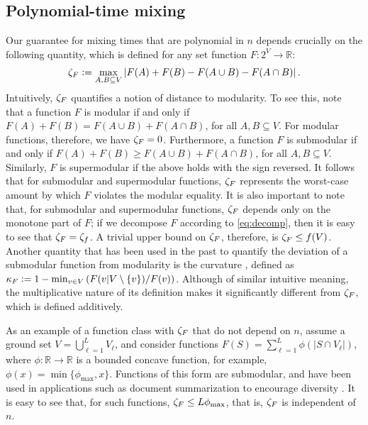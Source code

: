 \subsection{Polynomial-time mixing} \label{sect:poly}
Our guarantee for mixing times that are polynomial in $n$ depends crucially on the following quantity, which is defined for any set function $F : 2^V \to \mathbb{R}$:
\begin{align*}
  \zeta_F \vcentcolon= \max_{A, B \subseteq V} \left|F(A) + F(B) - F(A \cup B) - F(A \cap B) \right|.
\end{align*}
Intuitively, $\zeta_F$ quantifies a notion of distance to modularity.
To see this, note that a function $F$ is modular if and only if $F(A) + F(B) = F(A \cup B) + F(A \cap B)$, for all $A, B \subseteq V$.
For modular functions, therefore, we have $\zeta_F = 0$.
Furthermore, a function $F$ is submodular if and only if $F(A) + F(B) \geq F(A \cup B) + F(A \cap B)$, for all $A, B \subseteq V$.
Similarly, $F$ is supermodular if the above holds with the sign reversed.
It follows that for submodular and supermodular functions, $\zeta_F$ represents the worst-case amount by which $F$ violates the modular equality.
It is also important to note that, for submodular and supermodular functions, $\zeta_F$ depends only on the monotone part of $F$; if we decompose $F$ according to \eqref{eq:decomp}, then it is easy to see that $\zeta_F = \zeta_f$.
A trivial upper bound on $\zeta_F$, therefore, is $\zeta_F \leq f(V)$.
Another quantity that has been used in the past to quantify the deviation of a submodular function from modularity is the curvature \cite{conforti84}, defined as $\kappa_F \vcentcolon= 1 - \min_{v \in V} \left(F(v|V\setminus\{v\}) / F(v)\right)$.
Although of similar intuitive meaning, the multiplicative nature of its definition makes it significantly different from $\zeta_F$, which is defined additively.

As an example of a function class with $\zeta_F$ that do not depend on $n$, assume a ground set $V = \bigcup_{\ell = 1}^L V_{\ell}$, and consider functions $F(S) = \sum_{\ell = 1}^L \phi(|S \cap V_{\ell}|)$, where $\phi : \mathbb{R} \to \mathbb{R}$ is a bounded concave function, for example, $\phi(x) = \min\{\phi_{\max}, x\}$.
Functions of this form are submodular, and have been used in applications such as document summarization to encourage diversity \cite{lin11}.
It is easy to see that, for such functions, $\zeta_F \leq L\phi_{\max}$, that is, $\zeta_F$ is independent of $n$.

